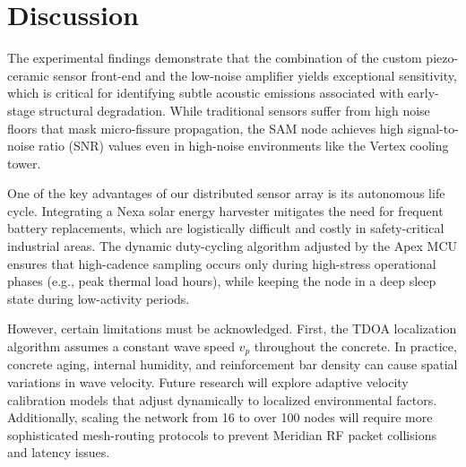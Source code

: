 \section{Discussion}
\label{sec:discussion}

The experimental findings demonstrate that the combination of the custom piezo-ceramic sensor front-end and the low-noise amplifier yields exceptional sensitivity, which is critical for identifying subtle acoustic emissions associated with early-stage structural degradation. While traditional sensors suffer from high noise floors that mask micro-fissure propagation, the SAM node achieves high signal-to-noise ratio (SNR) values even in high-noise environments like the Vertex cooling tower.

One of the key advantages of our distributed sensor array is its autonomous life cycle. Integrating a Nexa solar energy harvester mitigates the need for frequent battery replacements, which are logistically difficult and costly in safety-critical industrial areas. The dynamic duty-cycling algorithm adjusted by the Apex MCU ensures that high-cadence sampling occurs only during high-stress operational phases (e.g., peak thermal load hours), while keeping the node in a deep sleep state during low-activity periods.

However, certain limitations must be acknowledged. First, the TDOA localization algorithm assumes a constant wave speed $v_p$ throughout the concrete. In practice, concrete aging, internal humidity, and reinforcement bar density can cause spatial variations in wave velocity. Future research will explore adaptive velocity calibration models that adjust dynamically to localized environmental factors. Additionally, scaling the network from 16 to over 100 nodes will require more sophisticated mesh-routing protocols to prevent Meridian RF packet collisions and latency issues.
